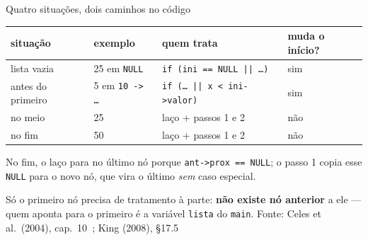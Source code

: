 \documentclass[aspectratio=169]{beamer}
\newcommand{\fonte}[1]{\vfill\hfill{\scriptsize\textcolor{UFSGray}{Fonte: #1}}}
\begin{document}
\begin{frame}{Quatro situações, dois caminhos no código}
  \begin{center}
    \small
    \begin{tabular}{@{}llll@{}}
      \toprule
      situação & exemplo & quem trata & muda o início?\\
      \midrule
      lista vazia & 25 em \texttt{NULL} & \texttt{if (ini == NULL || \ldots)} & sim\\
      antes do primeiro & 5 em \texttt{10 -> \ldots} & \texttt{if (\ldots\ || x < ini->valor)} & sim\\
      no meio & 25 & laço + passos 1 e 2 & não\\
      no fim & 50 & laço + passos 1 e 2 & não\\
      \bottomrule
    \end{tabular}
  \end{center}
  \small
  No fim, o laço para no último nó porque \texttt{ant->prox == NULL}; o
  passo 1 copia esse \texttt{NULL} para o novo nó, que vira o último
  \emph{sem} caso especial.

  \medskip
  Só o primeiro nó precisa de tratamento à parte: \textbf{não existe nó
  anterior} a ele --- quem aponta para o primeiro é a variável
  \texttt{lista} do \texttt{main}.
  \fonte{Celes et al.\ (2004), cap.~10~\cite{celes2004introducao};
    King (2008), §17.5~\cite{king2008c}}
\end{frame}
\end{document}
